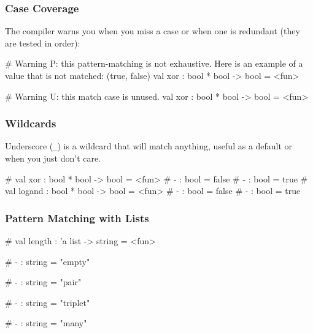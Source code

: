 \documentclass{plt}
\begin{document}
\begin{frame}[fragile]
  \frametitle{Case Coverage}

The compiler warns you when you miss a case or when one is redundant
(they are tested in order):

\begin{interactive}
# 
Warning P: this pattern-matching is not exhaustive.
Here is an example of a value that is not matched:
(true, false)
val xor : bool * bool -> bool = <fun>

# 
Warning U: this match case is unused.
val xor : bool * bool -> bool = <fun>
\end{interactive}

\end{frame}

\begin{frame}[fragile]
  \frametitle{Wildcards}

Underscore (\verb|_|) is a wildcard that will match anything, useful
as a default or when you just don't care.

\begin{interactive}
# 
val xor : bool * bool -> bool = <fun>
# 
- : bool = false
# 
- : bool = true
# 
val logand : bool * bool -> bool = <fun>
# 
- : bool = false
# 
- : bool = true
\end{interactive}

\end{frame}

\begin{frame}[fragile]
  \frametitle{Pattern Matching with Lists}

\begin{interactive}
# 
val length : 'a list -> string = <fun>

# 
- : string = "empty"

# 
- : string = "pair"

# 
- : string = "triplet"

# 
- : string = "many"
\end{interactive}

\end{frame}
\end{document}
